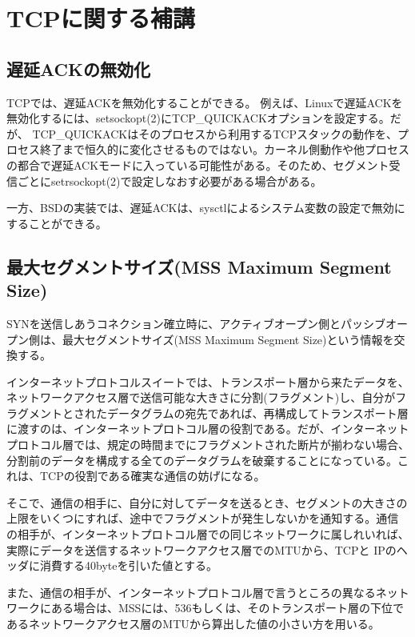 \chapter{TCPに関する補講}

\section{遅延ACKの無効化}

TCPでは、遅延ACKを無効化することができる。
例えば、Linuxで遅延ACKを無効化するには、setsockopt(2)にTCP\_QUICKACKオプションを設定する。だが、 TCP\_QUICKACKはそのプロセスから利用するTCPスタックの動作を、プロセス終了まで恒久的に変化させるものではない。カーネル側動作や他プロセスの都合で遅延ACKモードに入っている可能性がある。そのため、セグメント受信ごとにsetrsockopt(2)で設定しなおす必要がある場合がある。

一方、BSDの実装では、遅延ACKは、sysctlによるシステム変数の設定で無効にすることができる。

\section{最大セグメントサイズ(MSS Maximum Segment Size)}

SYNを送信しあうコネクション確立時に、アクティブオープン側とパッシブオープン側は、最大セグメントサイズ(MSS Maximum Segment Size)という情報を交換する。

インターネットプロトコルスイートでは、トランスポート層から来たデータを、ネットワークアクセス層で送信可能な大きさに分割(フラグメント)し、自分がフラグメントとされたデータグラムの宛先であれば、再構成してトランスポート層に渡すのは、インターネットプロトコル層の役割である。だが、インターネットプロトコル層では、規定の時間までにフラグメントされた断片が揃わない場合、分割前のデータを構成する全てのデータグラムを破棄することになっている。これは、TCPの役割である確実な通信の妨げになる。

そこで、通信の相手に、自分に対してデータを送るとき、セグメントの大きさの上限をいくつにすれば、途中でフラグメントが発生しないかを通知する。通信の相手が、インターネットプロトコル層での同じネットワークに属しれいれば、実際にデータを送信するネットワークアクセス層でのMTUから、TCPと IPのヘッダに消費する40byteを引いた値とする。

また、通信の相手が、インターネットプロトコル層で言うところの異なるネットワークにある場合は、MSSには、536もしくは、そのトランスポート層の下位であるネットワークアクセス層のMTUから算出した値の小さい方を用いる。

